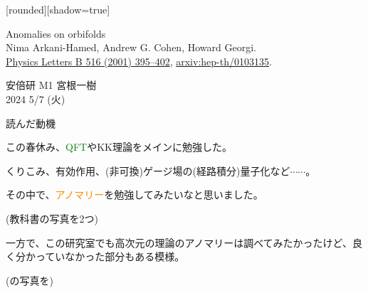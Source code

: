 \documentclass[
  unicode,a4paper,10pt,
  xcolor = {dvipsnames,svgnames},
  hyperref ={colorlinks=true,citecolor=Navy,linkcolor=NavyBlue,urlcolor=purple},
  ja=standard,lualatex
]{beamer}
\begin{document}
\nocite{Arkani-Hamed:2001uol}

\begin{frame}

  [rounded][shadow=true]
  \begin{block}{}
    \vspace*{5pt}

    \centering\Large
    Anomalies on orbifolds
    \\
    \normalsize
    Nima Arkani-Hamed, Andrew G. Cohen, Howard Georgi.
    \\
    \small
    \href{https://doi.org/10.1016/S0370-2693(01)00946-7}{Physics Letters B 516 (2001) 395–402},
    \href{https://doi.org/10.48550/arXiv.hep-th/0103135}{arxiv:hep-th/0103135}.

    \vspace*{5pt}
  \end{block}

  \begin{center}
    安倍研 M1 宮根一樹\\
    2024 5/7 (火)
  \end{center}
\end{frame}


\begin{frame}{読んだ動機}

  この春休み、\textcolor{Green}{QFT}やKK理論をメインに勉強した。

  \vspace*{5pt}
  
  くりこみ、有効作用、(非可換)ゲージ場の(経路積分)量子化など$\cdots\cdots$。

  \vspace*{5pt}
  \pause
  
  その中で、\textcolor{DarkOrange}{アノマリー}を勉強してみたいなと思いました。

  (教科書の写真を2つ)

\end{frame}


\begin{frame}

  一方で、この研究室でも高次元の理論のアノマリーは調べてみたかったけど、良く分かっていなかった部分もある模様。

  (\cite{Abe:2020vmv}の写真を)

\end{frame}
\end{document}
